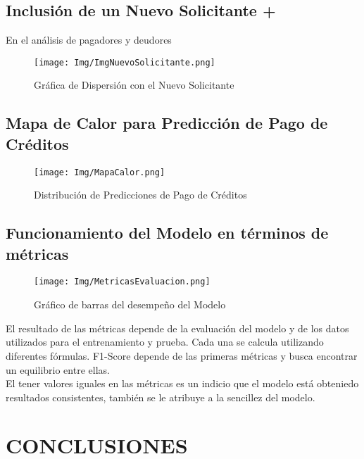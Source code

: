 \documentclass{article}
\begin{document}
\begin{sloppypar}
\subsection{Inclusión de un Nuevo Solicitante \textbf{+}} En el análisis de pagadores y deudores
    \begin{figure}[H]
    \centering
    \texttt{[image: Img/ImgNuevoSolicitante.png]}    \caption{\label{fig:nuevoSolicitante}Gráfica de Dispersión con el Nuevo Solicitante}
    \end{figure}
\vspace{0.5cm}
\subsection{Mapa de Calor para Predicción de Pago de Créditos}
    \begin{figure}[H]
    \centering
    \texttt{[image: Img/MapaCalor.png]}    \caption{\label{fig:MapaCalorPC}Distribución de Predicciones de Pago de Créditos}
    \end{figure}
\vspace{0.5cm}
\subsection{Funcionamiento del Modelo en términos de métricas}
    \begin{figure}[H]
    \centering
    \texttt{[image: Img/MetricasEvaluacion.png]}    \caption{\label{fig:MapaCalor} Gráfico de barras del desempeño del Modelo}
    \end{figure}
El resultado de las métricas depende de la evaluación del modelo y de los datos utilizados para el entrenamiento y prueba. Cada una se calcula utilizando diferentes fórmulas.  F1-Score depende de las primeras métricas y busca encontrar un equilibrio entre ellas. \\
El tener valores iguales en las métricas es un indicio que el modelo está obteniedo resultados consistentes, también se le atribuye a la sencillez del modelo.
\clearpage

\section{CONCLUSIONES}


\end{sloppypar}
\end{document}
